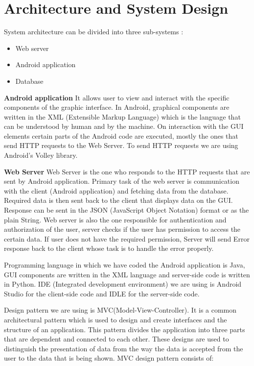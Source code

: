 \chapter{Architecture and System Design}

	System architecture can be divided into three sub-systems :
	\begin{itemize}
		\item 	 Web server
		\item 	 Android application
		\item 	 Database
	\end{itemize}
		
		\textbf{Android application}
		 It allows user to view and interact with the specific components of the graphic interface. In Android, graphical components are written in the XML (Extensible Markup Language) which is the language that can be understood by human and by the machine. On interaction with the GUI elements certain parts of the Android code are executed, mostly the ones that send HTTP requests to the Web Server. To send HTTP requests we are using Android’s Volley library.

		\textbf{Web Server}
		 Web Server is the one who responds to the HTTP requests that are sent by Android application. Primary task of the web server is communication with the client (Android application) and fetching data from the database. Required data is then sent back to the client that displays data on the GUI. Response can be sent in the JSON (JavaScript Object Notation) format or as the plain String. Web server is also the one responsible for authentication and authorization of the user, server checks if the user has permission to access the certain data. If user does not have the required permission, Server will send Error response back to the client whose task is to handle the error properly.

		 Programming language in which we have coded the Android application is Java, GUI components are written in the XML language and server-side code is written in Python. IDE (Integrated development environment) we are using is Android Studio for the client-side code and IDLE for the server-side code.

		 Design pattern we are using is MVC(Model-View-Controller). It is a common architectural pattern which is used to design and create interfaces and the structure of an application. This pattern divides the application into three parts that are dependent and connected to each other. These designs are used to distinguish the presentation of data from the way the data is accepted from the user to the data that is being shown. 
		 MVC design pattern consists of: 
			
